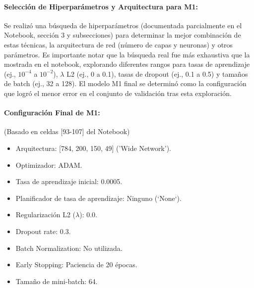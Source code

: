 \documentclass[11pt]{article}
\begin{document}
\paragraph{Selección de Hiperparámetros y Arquitectura para M1:}
Se realizó una búsqueda de hiperparámetros (documentada parcialmente en el Notebook, sección 3 y subsecciones) para determinar la mejor combinación de estas técnicas, la arquitectura de red (número de capas y neuronas) y otros parámetros. Es importante notar que la búsqueda real fue más exhaustiva que la mostrada en el notebook, explorando diferentes rangos para tasas de aprendizaje (ej., $10^{-4}$ a $10^{-2}$), $\lambda$ L2 (ej., 0 a 0.1), tasas de dropout (ej., 0.1 a 0.5) y tamaños de batch (ej., 32 a 128). El modelo M1 final se determinó como la configuración que logró el menor error en el conjunto de validación tras esta exploración.

\paragraph{Configuración Final de M1:} (Basado en celdas [93-107] del Notebook)
\begin{itemize}
    \item Arquitectura: [784, 200, 150, 49] ('Wide Network').
    \item Optimizador: ADAM.
    \item Tasa de aprendizaje inicial: 0.0005.
    \item Planificador de tasa de aprendizaje: Ninguno (`None`).
    \item Regularización L2 ($\lambda$): 0.0.
    \item Dropout rate: 0.3.
    \item Batch Normalization: No utilizada.
    \item Early Stopping: Paciencia de 20 épocas.
    \item Tamaño de mini-batch: 64.
\end{itemize}
\end{document}
